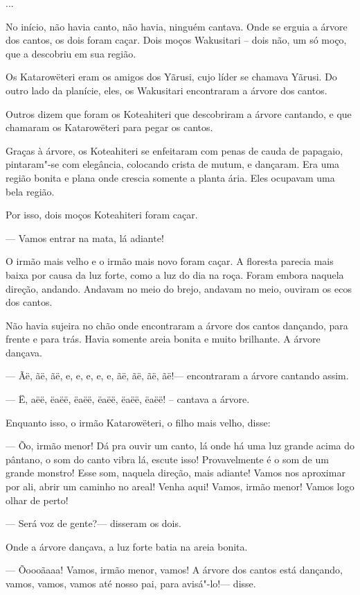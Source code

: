  ...

 No início, não havia canto, não havia, ninguém
cantava. Onde se erguia a árvore dos cantos, os dois foram caçar. Dois
moços Wakusitari -- dois não, um só moço, que a descobriu em sua região.

Os Katarowëteri eram os amigos dos Yãrusi, cujo líder se chamava Yãrusi.
Do outro lado da planície, eles, os Wakusitari encontraram a árvore dos
cantos. 

Outros dizem que foram os Koteahiteri que descobriram a árvore cantando,
e que chamaram os Katarowëteri para pegar os cantos. 

Graças à árvore, os Koteahiteri se enfeitaram com penas de cauda de
papagaio, pintaram"-se com elegância, colocando crista de mutum, e
dançaram. Era uma região bonita e plana onde crescia somente a planta
ária. Eles ocupavam uma bela região. 

Por isso, dois moços Koteahiteri foram caçar. 

--- Vamos entrar na mata, lá adiante! 

O irmão mais velho e o irmão mais novo foram caçar. A floresta parecia
mais baixa por causa da luz forte, como a luz do dia na roça. Foram
embora naquela direção, andando. Andavam no meio do brejo, andavam no
meio, ouviram os ecos dos cantos. 

Não havia sujeira no chão onde encontraram a árvore dos cantos dançando,
para frente e para trás. Havia somente areia bonita e muito brilhante. A
árvore dançava. 

--- Ãë, ãë, ãë, e, e, e, e, e, ãë, ãë, ãë, ãë!--- encontraram a árvore
cantando assim. 

--- Ë, aëë, ëaëë, ëaëë, ëaëë, ëaëë, ëaëë! -- cantava a árvore. 

Enquanto isso, o irmão Katarowëteri, o filho mais velho, disse: 

--- Õo, irmão menor! Dá pra ouvir um canto, lá onde há uma luz grande
acima do pântano, o som do canto vibra lá, escute isso! Provavelmente é
o som de um grande monstro! Esse som, naquela direção, mais adiante!
Vamos nos aproximar por ali, abrir um caminho no areal! Venha aqui!
Vamos, irmão menor! Vamos logo olhar de perto! 

--- Será voz de gente?--- disseram os dois. 

Onde a árvore dançava, a luz forte batia na areia bonita. 

--- Õoooãaaa! Vamos, irmão menor, vamos! A árvore dos cantos está
dançando, vamos, vamos, vamos até nosso pai, para avisá"-lo!--- disse. 

